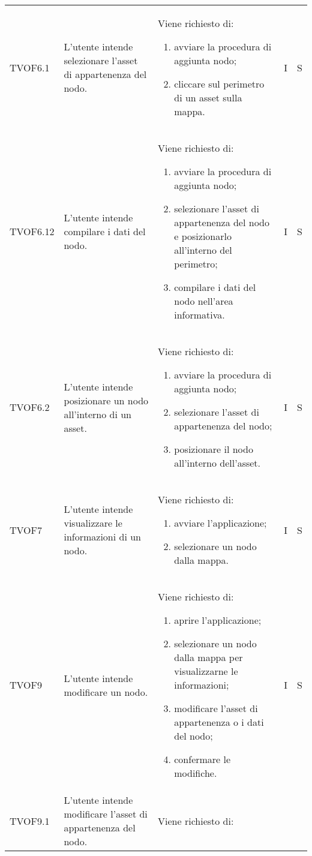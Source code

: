 \begin{longtable}{p{1.8cm}!{\VRule[1pt]}p{3.5cm}!{\VRule[1pt]}p{5.5cm}!{\VRule[1pt]}p{1cm}!{\VRule[1pt]}p{1cm}}
	TVOF6.1 & L'utente intende selezionare l'asset di appartenenza del nodo. & Viene richiesto di: \begin{enumerate} 
		\item avviare la procedura di aggiunta nodo; 
		\item cliccare sul perimetro di un asset sulla mappa. 
	\end{enumerate} & I & S \\ 
	TVOF6.12 & L'utente intende compilare i dati del nodo. & Viene richiesto di: \begin{enumerate} 
		\item avviare la procedura di aggiunta nodo; 
		\item selezionare l'asset di appartenenza del nodo e posizionarlo all'interno del perimetro; 
		\item compilare i dati del nodo nell'area informativa. 
	\end{enumerate} & I & S \\ 
	TVOF6.2 & L'utente intende posizionare un nodo all'interno di un asset. & Viene richiesto di: \begin{enumerate} 
		\item avviare la procedura di aggiunta nodo; 
		\item selezionare l'asset di appartenenza del nodo; 
		\item posizionare il nodo all'interno dell'asset. 
	\end{enumerate} & I & S \\ 
	TVOF7 & L'utente intende visualizzare le informazioni di un nodo. & Viene richiesto di: \begin{enumerate} 
		\item avviare l'applicazione; 
		\item selezionare un nodo dalla mappa. 
	\end{enumerate} & I & S \\ 
	TVOF9 & L'utente intende modificare un nodo. & Viene richiesto di: \begin{enumerate} 
		\item aprire l'applicazione; 
		\item selezionare un nodo dalla mappa per visualizzarne le informazioni; 
		\item modificare l'asset di appartenenza o i dati del nodo; 
		\item confermare le modifiche. 
	\end{enumerate} & I & S \\ 
	TVOF9.1 & L'utente intende modificare l'asset di appartenenza del nodo. & Viene richiesto di: \begin{enumerate} 

\end{enumerate}
\end{longtable}
